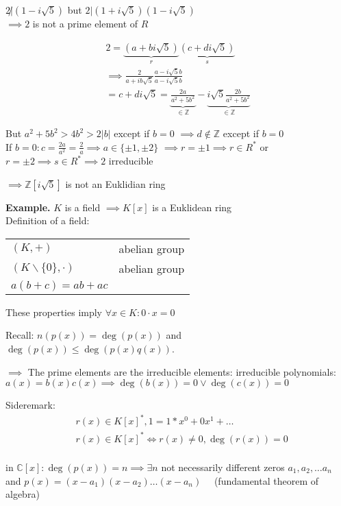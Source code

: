 $2 \not| (1 - i\sqrt{5})$ but $2 | (1+i\sqrt{5})(1-i\sqrt{5})$ \\
$\implies 2$ is not a prime element of $R$

\begin{align*}
  2 = \underbrace{(a+bi \sqrt{5})}_{r} \underbrace{(c+di\sqrt{5})}_{s}\\
  \implies \frac{2}{a+ib\sqrt{5}} \frac{a-i\sqrt{5}b}{a-i\sqrt{5}b} \\
  = c+di\sqrt{5}
= \underbrace{\frac{2a}{a^2 + 5b^2}}_{\in \mathbb{Z}} - \underbrace{i\sqrt{5} \frac{2b}{a^2 + 5b^2}}_{\in \mathbb{Z}}
\end{align*}

But $a^2 + 5b^2 > 4b^2 > 2|b|$ except if $ b=0$ $\implies d \not\in \mathbb{Z}$ except if $b=0$ \\
If $b=0: c = \frac{2a}{a^2} = \frac{2}{a} \implies a \in \{\pm 1, \pm 2\}$
$\implies r = \pm 1 \implies r \in R^{*}$ or $ r = \pm 2 \implies s \in R^{*} \implies 2 $ irreducible

$\implies \mathbb{Z}[i\sqrt{5}]$ is not an Euklidian ring

\textbf{Example.}
$K$ is a field $\implies K[x]$ is a Euklidean ring\\

Definition of a field:
\begin{tabular}{ll}
  $(K,+)$ &abelian group \\
  $(K\backslash \{0\}, \cdot)$ & abelian group \\
  $a(b+c) = ab + ac$
\end{tabular}

These properties imply $\forall x \in K: 0\cdot x = 0$

Recall:
$n(p(x)) = \deg(p(x))$ and
$\deg(p(x)) \leq \deg(p(x) q(x))$.

$\implies$ The prime elements are the irreducible elements: irreducible polynomials: $a(x) = b(x)c(x) \implies \deg(b(x))=0 \lor \deg(c(x))=0$

Sideremark:
\begin{align*}
  &r(x) \in K[x]^{*}, 1 = 1*x^0 + 0 x^1 + \ldots \\
  &r(x) \in K[x]^{*} \Leftrightarrow r(x) \neq 0, \deg(r(x)) = 0\\
\end{align*}

in $\mathbb{C}[x]:
\deg(p(x)) = n \implies \exists n$ not necessarily different zeros $a_1, a_2, \ldots a_n$ and $p(x) = (x-a_1)(x-a_2) \ldots (x-a_n) \quad$ (fundamental theorem of algebra)

